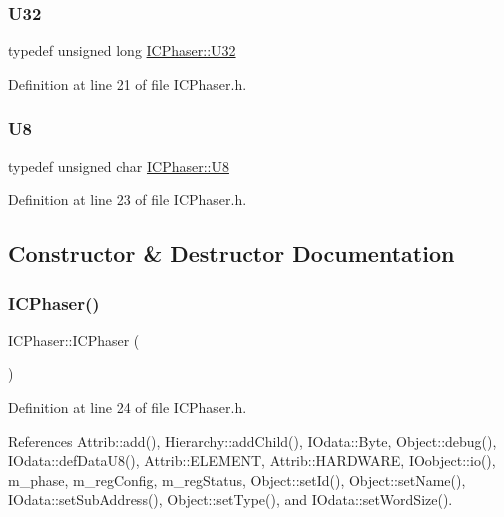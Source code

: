 \subsubsection{\texorpdfstring{U32}{U32}}
{\footnotesize\ttfamily typedef unsigned long \hyperlink{classICPhaser_ae7a88b0c8e5ce2b7406c0e6bcd6f2a24}{I\+C\+Phaser\+::\+U32}}



Definition at line 21 of file I\+C\+Phaser.\+h.

\mbox{\label{classICPhaser_a4f9b2302efbd7bdd70d7d80b415f1a9d}} 
\subsubsection{\texorpdfstring{U8}{U8}}
{\footnotesize\ttfamily typedef unsigned char \hyperlink{classICPhaser_a4f9b2302efbd7bdd70d7d80b415f1a9d}{I\+C\+Phaser\+::\+U8}}



Definition at line 23 of file I\+C\+Phaser.\+h.



\subsection{Constructor \& Destructor Documentation}
\mbox{\label{classICPhaser_adcbdbce69b6d9e97809f168e3ecbda30}} 
\subsubsection{\texorpdfstring{I\+C\+Phaser()}{ICPhaser()}}
{\footnotesize\ttfamily I\+C\+Phaser\+::\+I\+C\+Phaser (\begin{DoxyParamCaption}{ }\end{DoxyParamCaption})\hspace{0.3cm}{\ttfamily [inline]}}



Definition at line 24 of file I\+C\+Phaser.\+h.



References Attrib\+::add(), Hierarchy\+::add\+Child(), I\+Odata\+::\+Byte, Object\+::debug(), I\+Odata\+::def\+Data\+U8(), Attrib\+::\+E\+L\+E\+M\+E\+NT, Attrib\+::\+H\+A\+R\+D\+W\+A\+RE, I\+Oobject\+::io(), m\+\_\+phase, m\+\_\+reg\+Config, m\+\_\+reg\+Status, Object\+::set\+Id(), Object\+::set\+Name(), I\+Odata\+::set\+Sub\+Address(), Object\+::set\+Type(), and I\+Odata\+::set\+Word\+Size().


